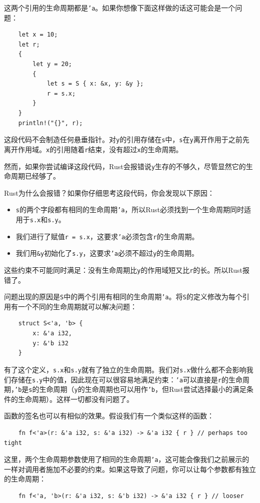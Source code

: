 这两个引用的生命周期都是\texttt{'a}。如果你想像下面这样做的话这可能会是一个问题：
\begin{verbatim}
    let x = 10;
    let r;
    {
        let y = 20;
        {
            let s = S { x: &x, y: &y };
            r = s.x;
        }
    }
    println!("{}", r);
\end{verbatim}

这段代码不会制造任何悬垂指针。对\texttt{y}的引用存储在\texttt{s}中，\texttt{s}在\texttt{y}离开作用于之前先离开作用域。\texttt{x}的引用随着\texttt{r}结束，没有超过\texttt{x}的生命周期。

然而，如果你尝试编译这段代码，Rust会报错说\texttt{y}生存的不够久，尽管显然它的生命周期已经够了。

Rust为什么会报错？如果你仔细思考这段代码，你会发现以下原因：
\begin{itemize}
    \item \texttt{s}的两个字段都有相同的生命周期\texttt{'a}，所以Rust必须找到一个生命周期同时适用于\texttt{s.x}和\texttt{s.y}。
    \item 我们进行了赋值\texttt{r = s.x}，这要求\texttt{'a}必须包含\texttt{r}的生命周期。
    \item 我们用\texttt{\&y}初始化了\texttt{s.y}，这要求\texttt{'a}必须不超过\texttt{y}的生命周期。
\end{itemize}

这些约束不可能同时满足：没有生命周期比\texttt{y}的作用域短又比\texttt{r}的长。所以Rust报错了。

问题出现的原因是\texttt{S}中的两个引用有相同的生命周期\texttt{'a}。将\texttt{S}的定义修改为每个引用有一个不同的生命周期就可以解决问题：
\begin{verbatim}
    struct S<'a, 'b> {
        x: &'a i32,
        y: &'b i32
    }
\end{verbatim}

有了这个定义，\texttt{s.x}和\texttt{s.y}就有了独立的生命周期。我们对\texttt{s.x}做什么都不会影响我们存储在\texttt{s.y}中的值，因此现在可以很容易地满足约束：\texttt{'a}可以直接是\texttt{r}的生命周期，\texttt{'b}是\texttt{s}的生命周期（\texttt{y}的生命周期也可以用作\texttt{'b}，但Rust尝试选择最小的满足条件的生命周期）。这样一切都没有问题了。

函数的签名也可以有相似的效果。假设我们有一个类似这样的函数：
\begin{verbatim}
    fn f<'a>(r: &'a i32, s: &'a i32) -> &'a i32 { r } // perhaps too tight
\end{verbatim}

这里，两个生命周期参数使用了相同的生命周期\texttt{'a}，这可能会像我们之前展示的一样对调用者施加不必要的约束。如果这导致了问题，你可以让每个参数都有独立的生命周期：
\begin{verbatim}
    fn f<'a, 'b>(r: &'a i32, s: &'b i32) -> &'a i32 { r } // looser
\end{verbatim}

